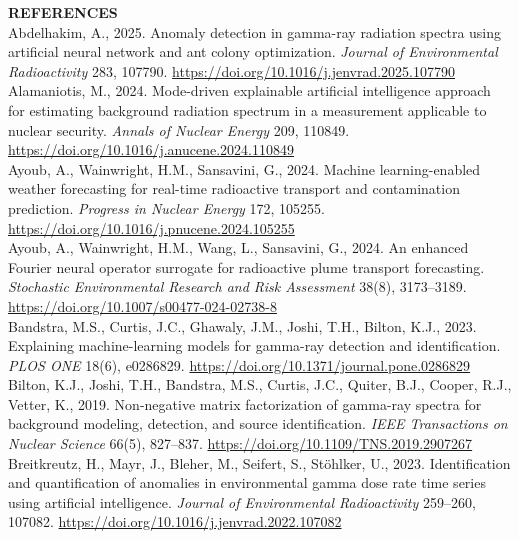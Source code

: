 \documentclass[11pt,a4paper]{article}
\begin{document}
\newpage

\begin{framed}
\noindent\textbf{REFERENCES}\\[0.6em]
\noindent Abdelhakim, A., 2025. Anomaly detection in gamma-ray radiation spectra using artificial neural network and ant colony optimization. \textit{Journal of Environmental Radioactivity} 283, 107790. \url{https://doi.org/10.1016/j.jenvrad.2025.107790}\\[0.5em]
\noindent Alamaniotis, M., 2024. Mode-driven explainable artificial intelligence approach for estimating background radiation spectrum in a measurement applicable to nuclear security. \textit{Annals of Nuclear Energy} 209, 110849. \url{https://doi.org/10.1016/j.anucene.2024.110849}\\[0.5em]
\noindent Ayoub, A., Wainwright, H.M., Sansavini, G., 2024. Machine learning-enabled weather forecasting for real-time radioactive transport and contamination prediction. \textit{Progress in Nuclear Energy} 172, 105255. \url{https://doi.org/10.1016/j.pnucene.2024.105255}\\[0.5em]
\noindent Ayoub, A., Wainwright, H.M., Wang, L., Sansavini, G., 2024. An enhanced Fourier neural operator surrogate for radioactive plume transport forecasting. \textit{Stochastic Environmental Research and Risk Assessment} 38(8), 3173--3189. \url{https://doi.org/10.1007/s00477-024-02738-8}\\[0.5em]
\noindent Bandstra, M.S., Curtis, J.C., Ghawaly, J.M., Joshi, T.H., Bilton, K.J., 2023. Explaining machine-learning models for gamma-ray detection and identification. \textit{PLOS ONE} 18(6), e0286829. \url{https://doi.org/10.1371/journal.pone.0286829}\\[0.5em]
\noindent Bilton, K.J., Joshi, T.H., Bandstra, M.S., Curtis, J.C., Quiter, B.J., Cooper, R.J., Vetter, K., 2019. Non-negative matrix factorization of gamma-ray spectra for background modeling, detection, and source identification. \textit{IEEE Transactions on Nuclear Science} 66(5), 827--837. \url{https://doi.org/10.1109/TNS.2019.2907267}\\[0.5em]
\noindent Breitkreutz, H., Mayr, J., Bleher, M., Seifert, S., Stöhlker, U., 2023. Identification and quantification of anomalies in environmental gamma dose rate time series using artificial intelligence. \textit{Journal of Environmental Radioactivity} 259--260, 107082. \url{https://doi.org/10.1016/j.jenvrad.2022.107082}\\[0.5em]

\end{framed}
\end{document}
